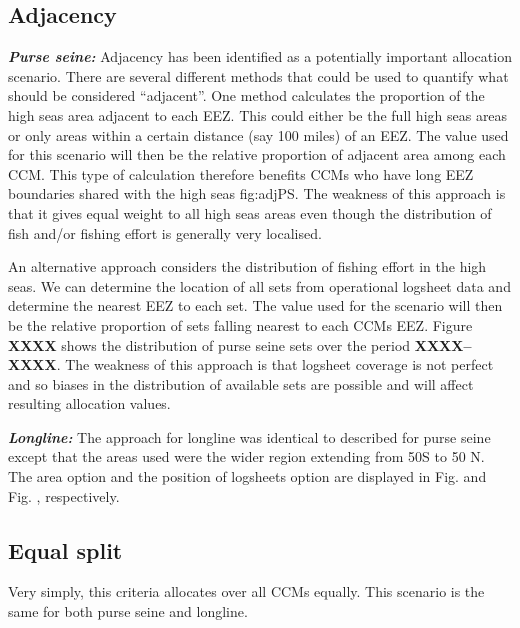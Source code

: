 \documentclass[11pt]{article}
\begin{document}
\subsection*{Adjacency}
\noindent\textbf{\emph{Purse seine:}}
Adjacency has been identified as a potentially important allocation scenario. There are several different methods that could be used to quantify what should be considered ``adjacent''. One method calculates the proportion of the high seas area adjacent to each EEZ. This could either be the full high seas areas or only areas within a certain distance (say 100 miles) of an EEZ. The value used for this scenario will then be the relative proportion of adjacent area among each CCM. This type of calculation therefore benefits CCMs who have long EEZ boundaries shared with the high seas {fig:adjPS}. The weakness of this approach is that it gives equal weight to all high seas areas even though the distribution of fish and/or fishing effort is generally very localised.

An alternative approach considers the distribution of fishing effort in the high seas. We can determine the location of all sets from operational logsheet data and determine the nearest EEZ to each set. The value used for the scenario will then be the relative proportion of sets falling nearest to each CCMs EEZ. Figure {\bf XXXX} shows the distribution of purse seine sets over the period {\bf XXXX--XXXX}. The weakness of this approach is that logsheet coverage is not perfect and so biases in the distribution of available sets are possible and will affect resulting allocation values.

\noindent\textbf{\emph{Longline:}}
The approach for longline was identical to described for purse seine except that the areas used were the wider region extending from 50\degree S to 50 \degree N. The area option and the position of logsheets option are displayed in Fig.  and Fig. , respectively.

\subsection*{Equal split}
Very simply, this criteria allocates over all CCMs equally. This scenario is the same for both purse seine and longline.
\end{document}
